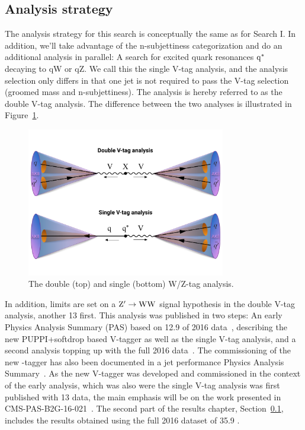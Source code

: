 \subsection{Analysis strategy}
The analysis strategy for this search is conceptually the same as for Search I. In addition, we'll take advantage of the n-subjettiness categorization and do an additional analysis in parallel: A search for excited quark resonances $\rm{q^*}$~\cite{Bauer1987,PhysRevD.42.815} decaying to qW or qZ.
We call this the single V-tag analysis, and the analysis selection only differs in that one jet is not required to pass the V-tag selection (groomed mass and n-subjettiness). The \VV analysis is hereby referred to as the double V-tag analysis. The difference between the two analyses is illustrated in Figure~\ref{fig:searchII:svsd}. 

\begin{figure}[h!]
\centering
\includegraphics[height=6.5cm]{figures/analysis/search2/misc/singlevsdoubletag.pdf}
\caption{The double (top) and single (bottom) W/Z-tag analysis.}
\label{fig:searchII:svsd}
\end{figure}

In addition, limits are set on a $\mathrm{Z}^\prime \rightarrow \mathrm{W}\mathrm{W}$ signal hypothesis in the double V-tag analysis, another 13 \TeV first.\newline
This analysis was published in two steps: An early Physics Analysis Summary (PAS) based on 12.9 \fbinv of 2016 data~\cite{CMS-PAS-B2G-16-021}, describing the new  PUPPI+softdrop based V-tagger as well as the single V-tag analysis, and a second analysis topping up with the full 2016 data~\cite{PhysRevD.97.072006}. The commissioning of the new \PW\PZ-tagger has also been documented in a jet performance Physics Analysis Summary~\cite{CMS-PAS-JME-16-003}. As the new V-tagger was developed and commissioned in the context of the early analysis, which was also were the single V-tag analysis was first published with 13 \TeV data, the main emphasis will be on the work presented in CMS-PAS-B2G-16-021~\cite{CMS-PAS-B2G-16-021}. The second part of the results chapter, Section~\ref{}, includes the results obtained using the full 2016 dataset of 35.9 \fbinv.

